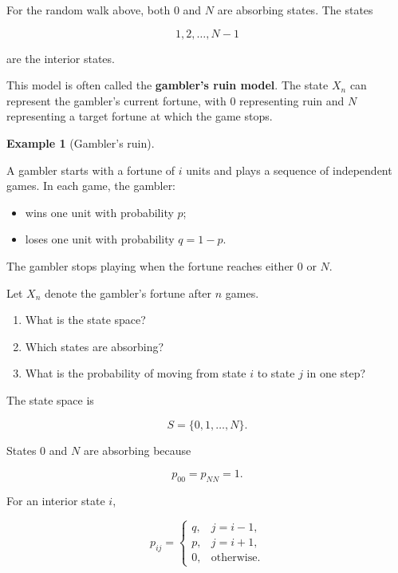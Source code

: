 \documentclass[
  letterpaper,
  DIV=11,
  numbers=noendperiod]{scrartcl}
\providecommand{\tightlist}{%
  \setlength{\itemsep}{0pt}\setlength{\parskip}{0pt}}
\theoremstyle{definition}
\newtheorem{example}{Example}[section]
\theoremstyle{remark}
\begin{document}
For the random walk above, both \(0\) and \(N\) are absorbing states.
The states

\[
1,2,\ldots,N-1
\]

are the interior states.

This model is often called the \textbf{gambler's ruin model}. The state
\(X_n\) can represent the gambler's current fortune, with \(0\)
representing ruin and \(N\) representing a target fortune at which the
game stops.

\begin{example}[Gambler's
ruin]\protect\hypertarget{exm-gambler-ruin}{}\label{exm-gambler-ruin}

A gambler starts with a fortune of \(i\) units and plays a sequence of
independent games. In each game, the gambler:

\begin{itemize}
\tightlist
\item
  wins one unit with probability \(p\);
\item
  loses one unit with probability \(q=1-p\).
\end{itemize}

The gambler stops playing when the fortune reaches either \(0\) or
\(N\).

Let \(X_n\) denote the gambler's fortune after \(n\) games.

\begin{enumerate}
\def\labelenumi{\arabic{enumi}.}
\tightlist
\item
  What is the state space?
\item
  Which states are absorbing?
\item
  What is the probability of moving from state \(i\) to state \(j\) in
  one step?
\end{enumerate}

\end{example}

The state space is

\[
S=\{0,1,\ldots,N\}.
\]

States \(0\) and \(N\) are absorbing because

\[
p_{00}=p_{NN}=1.
\]

For an interior state \(i\),

\[
p_{ij}
=
\begin{cases}
q, & j=i-1,\\
p, & j=i+1,\\
0, & \text{otherwise}.
\end{cases}
\]
\end{document}
